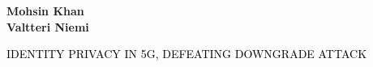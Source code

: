 \documentclass[portrait,a0]{a0poster}
\begin{document}
\begin{multicols}{2} 
\begin{minipage}[t]{1.5\linewidth}
\vspace{10pt}
\begin{flushleft}
\begin{spacing}{5}

\end{spacing}
\end{flushleft}
\end{minipage}

\begin{minipage}[t]{.95\linewidth} %
\vspace{-110pt} %
\begin{flushright}
\textsf{\bfseries
Mohsin Khan%
\\
Valtteri Niemi%
} %
\end{flushright}
\end{minipage}
\end{multicols}


\vspace{30pt}

\begin{center}
 {\Huge{}\textcolor{black}{\MakeUppercase{Identity Privacy in 5G, Defeating Downgrade Attack}} \MakeUppercase{}}
\end{center}

\vspace{20pt}
\noindent\makebox[\linewidth]{\rule{\paperwidth}{5pt}}
\end{document}
